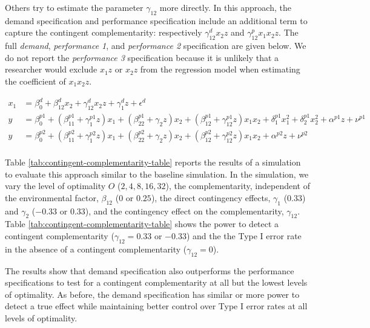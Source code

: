 \documentclass[12pt]{article}
\begin{document}


Others try to estimate the parameter $\gamma_{12}$ more directly. In this approach, the demand specification and performance specification include an additional term to capture the contingent complementarity: respectively $\gamma^d_{12} x_2 z$ and $\gamma^p_{12} x_1 x_2 z$. The full \emph{demand}, \emph{performance 1}, and \emph{performance 2} specification are given below. We do not report the \emph{performance 3} specification because it is unlikely that a researcher would exclude $x_1 z$ or $x_2 z$ from the regression model when estimating the coefficient of $x_1 x_2 z$.


\begin{align*} 
x_1 &= \beta_0^d + \beta_{12}^d x_2 + \gamma_{12}^d x_2 z
        + \gamma_{1}^d z
        + \epsilon^d \\
y &=  \beta^{p1}_0 + (\beta^{p1}_{11} + \gamma_1^{p1} z )x_1 
						+ (\beta_{22}^{p1} + \gamma_2 z ) x_2 
                        + (\beta_{12}^{p1} + \gamma_{12}^{p1} z) x_1 x_2 
                        + \delta_1^{p1} x^2_1 + \delta_2^{p1} x^2_2 
                        + \alpha^{p1} z
                        + \nu^{p1} \\
 y &=  \beta^{p2}_0 + (\beta^{p2}_{11} + \gamma_1^{p2} z )x_1 
						+ (\beta_{22}^{p2} + \gamma_2 z ) x_2 
                        + (\beta_{12}^{p2} + \gamma_{12}^{p2} z) x_1 x_2 
                        + \alpha^{p2} z
                        + \nu^{p2} \\
\end{align*}

Table \ref{tab:contingent-complementarity-table} reports the results of a simulation to evaluate this approach similar to the baseline simulation. In the simulation, we vary the level of optimality $O$ ($2, 4, 8, 16, 32$), the complementarity, independent of the environmental factor, $\beta_{12}$ ($0$ or $0.25$), the direct contingency effects, $\gamma_1$ ($0.33$) and $\gamma_2$ ($-0.33$ or $0.33$), and the contingency effect on the complementarity, $\gamma_{12}$. Table \ref{tab:contingent-complementarity-table} shows the power to detect a contingent complementarity ($\gamma_{12} = 0.33$ or $-0.33$) and the the Type I error rate in the absence of a contingent complementarity ($\gamma_{12} = 0$). 

The results show that demand specification also outperforms the performance specifications to test for a contingent complementarity at all but the lowest levels of optimality. As before, the demand specification has similar or more power to detect a true effect while maintaining better control over Type I error rates at all levels of optimality.
\end{document}
